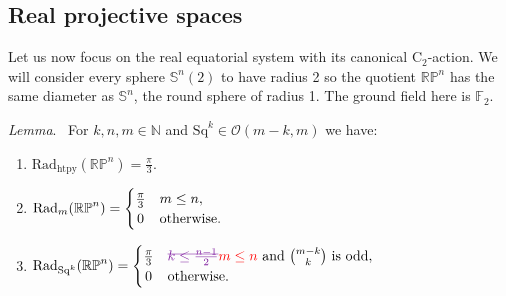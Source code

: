\documentclass{amsart}
\theoremstyle{definition}
\newcommand{\N}{\mathbb{N}}
\newcommand{\Ftwo}{{\mathbb{F}_2}}
\newcommand{\rC}{\mathrm{C}}
\newcommand{\cO}{\mathcal{O}}
\newcommand{\bS}{\mathbb{S}}
\newcommand{\darkblue}{\color{darkblue}}
\newcommand{\Sq}{\mathrm{Sq}}
\renewcommand{\lemma}{\medskip\noindent\textit{\darkblue Lemma}.\ }
\theoremstyle{theorem}
\newcommand{\rp}{\mathbb{RP}}
\newcommand{\crit}{\mathrm{Rad}_{\mathrm{htpy}}}
\newcommand{\firstdeath}[2]{\mathrm{Rad}_{#1}(#2)}
\newcommand{\oldmath}[1]{{\color{deletedpurple}\mathpalette\horizontalstrike{#1}}}
\newcommand{\horizontalstrike}[2]{\sbox0{$#1#2$}\rlap{\raisebox{.5\ht0}{\rule{\wd0}{.4pt}}}\usebox0}
\newcommand{\newmath}[1]{{\color{red}#1}}
\begin{document}
\subsection{Real projective spaces}\label{s:critical_radii_rpn}

Let us now focus on the real equatorial system with its canonical \(\rC_2\)-action.
We will consider every sphere \(\bS^n(2)\) to have radius 2 so the quotient \(\rp^n\) has the same diameter as \(\bS^n\), the round sphere of radius 1.
The ground field here is \(\Ftwo\).

\lemma
For \(k,n,m \in \N\) and \(\Sq^k \in \cO(m-k, m)\) we have:
\begin{enumerate}
	\item \(\crit(\rp^n) = \frac{\pi}{3}\).
	\item \(\firstdeath{m}{\rp^n} =
	\begin{cases}
		\frac{\pi}{3} & m \leq n, \\
		\hfil 0 & \text{otherwise}.
	\end{cases}\)
	\item \(\firstdeath{\Sq^k}{\rp^n} =
	\begin{cases}
		\tfrac{\pi}{3} & \oldmath{k \leq \frac{n-1}{2}}\newmath{m\leq n}\text{ and } \binom{m-k}{k} \text{ is odd},\\
		\hfil 0 & \text{otherwise}. \\
	\end{cases}\)
\end{enumerate}
\end{document}
